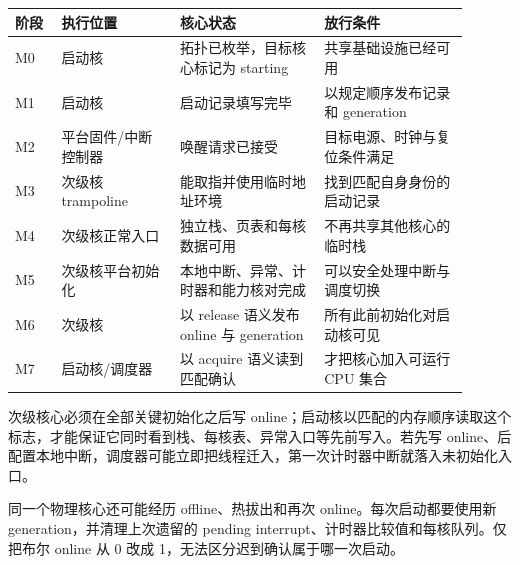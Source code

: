 \begin{longtable}{L{0.09\linewidth}L{0.23\linewidth}L{0.29\linewidth}L{0.29\linewidth}}
\toprule
阶段 & 执行位置 & 核心状态 & 放行条件 \\
\midrule
M0 & 启动核 & 拓扑已枚举，目标核心标记为 starting & 共享基础设施已经可用 \\\tablerowrule
M1 & 启动核 & 启动记录填写完毕 & 以规定顺序发布记录和 generation \\\tablerowrule
M2 & 平台固件/中断控制器 & 唤醒请求已接受 & 目标电源、时钟与复位条件满足 \\\tablerowrule
M3 & 次级核 trampoline & 能取指并使用临时地址环境 & 找到匹配自身身份的启动记录 \\\tablerowrule
M4 & 次级核正常入口 & 独立栈、页表和每核数据可用 & 不再共享其他核心的临时栈 \\\tablerowrule
M5 & 次级核平台初始化 & 本地中断、异常、计时器和能力核对完成 & 可以安全处理中断与调度切换 \\\tablerowrule
M6 & 次级核 & 以 release 语义发布 online 与 generation & 所有此前初始化对启动核可见 \\\tablerowrule
M7 & 启动核/调度器 & 以 acquire 语义读到匹配确认 & 才把核心加入可运行 CPU 集合 \\
\bottomrule
\end{longtable}


次级核心必须在全部关键初始化之后写 online；启动核以匹配的内存顺序读取这个标志，才能保证它同时看到栈、每核表、异常入口等先前写入。若先写 online、后配置本地中断，调度器可能立即把线程迁入，第一次计时器中断就落入未初始化入口。

同一个物理核心还可能经历 offline、热拔出和再次 online。每次启动都要使用新 generation，并清理上次遗留的 pending interrupt、计时器比较值和每核队列。仅把布尔 online 从 0 改成 1，无法区分迟到确认属于哪一次启动。


